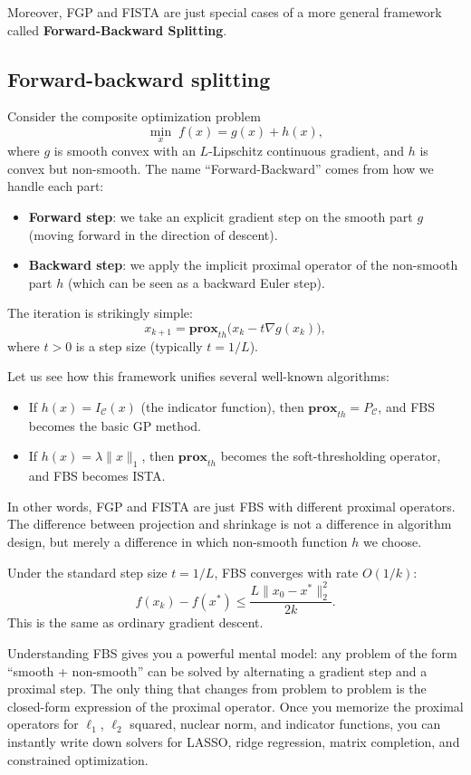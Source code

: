 \documentclass[lang=en,color=blue,mode=fancy,titlestyle=hang]{elegantbook}
\begin{document}
Moreover, FGP and FISTA are just special cases of a more general framework called
\textbf{Forward-Backward Splitting}.

\subsection{Forward-backward splitting}

Consider the composite optimization problem
\[
\min_{x} \; f(x) = g(x) + h(x),
\]
where $g$ is smooth convex with an $L$-Lipschitz continuous gradient, and $h$ is convex but
non-smooth. The name ``Forward-Backward'' comes from how we handle each part:
\begin{itemize}
  \item \textbf{Forward step}: we take an explicit gradient step on the smooth part $g$
  (moving forward in the direction of descent).
  \item \textbf{Backward step}: we apply the implicit proximal operator of the non-smooth part $h$
  (which can be seen as a backward Euler step).
\end{itemize}

The iteration is strikingly simple:
\[
x_{k+1} = \mathbf{prox}_{t h}\bigl( x_k - t \nabla g(x_k) \bigr),
\]
where $t > 0$ is a step size (typically $t = 1/L$). 

Let us see how this framework unifies several well-known algorithms:
\begin{itemize}
  \item If $h(x) = I_{\mathcal{C}}(x)$ (the indicator function), then
  $\mathbf{prox}_{t h} = P_{\mathcal{C}}$, and FBS becomes the basic GP method.
  \item If $h(x) = \lambda \|x\|_1$, then $\mathbf{prox}_{t h}$ becomes the soft-thresholding
  operator, and FBS becomes ISTA.
\end{itemize}

In other words, FGP and FISTA are just FBS with different proximal operators. The difference
between projection and shrinkage is not a difference in algorithm design, but merely a
difference in which non-smooth function $h$ we choose.

Under the standard step size $t = 1/L$, FBS converges with rate $O(1/k)$:
\[
f(x_k) - f(x^*) \le \frac{L \|x_0 - x^*\|_2^2}{2k}.
\]
This is the same as ordinary gradient descent.

Understanding FBS gives you a powerful mental model: any problem of the form ``smooth + non-smooth''
can be solved by alternating a gradient step and a proximal step. The only thing that changes from
problem to problem is the closed-form expression of the proximal operator. Once you memorize the
proximal operators for $\ell_1$, $\ell_2$ squared, nuclear norm, and indicator functions, you
can instantly write down solvers for LASSO, ridge regression, matrix completion, and constrained
optimization.
\end{document}
